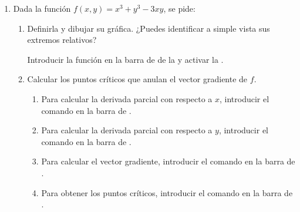 \begin{enumerate}[leftmargin=*]
\item Dada la función $f(x,y)=x^3+y^3-3xy$, se pide:
      \begin{enumerate}
      \item Definirla y dibujar su gráfica. ¿Puedes identificar a simple vista sus extremos relativos?
            \begin{indication}
            Introducir la función  en la barra de  de la  y activar la .
            \end{indication}

      \item Calcular los puntos críticos que anulan el vector gradiente de $f$.
            \begin{indication}
            \begin{enumerate}
            \item Para calcular la derivada parcial con respecto a $x$, introducir el comando  en la barra de .
            \item Para calcular la derivada parcial con respecto a $y$, introducir el comando  en la barra de .
            \item Para calcular el vector gradiente, introducir el comando  en la barra de .
            \item Para obtener los puntos críticos, introducir el comando  en la barra de .
            \end{enumerate}
            \end{indication}


\end{enumerate}
\end{enumerate}
